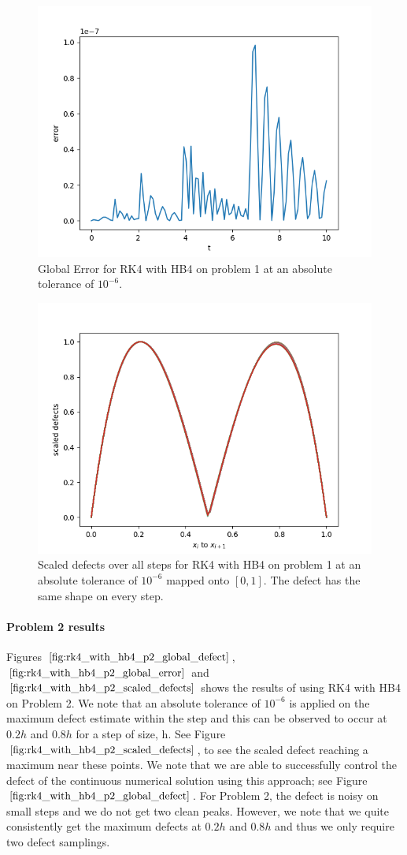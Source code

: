 \begin{figure}[H]
\centering
\includegraphics[width=0.7\linewidth]{./figures/rk4_with_hb4_p1_global_error}
\caption{Global Error for RK4 with HB4 on problem 1 at an absolute tolerance of $10^{-6}$.}
\label{fig:rk4_with_hb4_p1_global_error}
\end{figure}

\begin{figure}[H]
\centering
\includegraphics[width=0.7\linewidth]{./figures/rk4_with_hb4_p1_scaled_defects}
\caption{Scaled defects over all steps for RK4 with HB4 on problem 1 at an absolute tolerance of $10^{-6}$ mapped onto $[0, 1]$. The defect has the same shape on every step.}
\label{fig:rk4_with_hb4_p1_scaled_defects}
\end{figure}

\paragraph{Problem 2 results}
Figures $\ref{fig:rk4_with_hb4_p2_global_defect}$, $\ref{fig:rk4_with_hb4_p2_global_error}$ and $\ref{fig:rk4_with_hb4_p2_scaled_defects}$ shows the results of using RK4 with HB4 on Problem 2. We note that an absolute tolerance of $10^{-6}$ is applied on the maximum defect estimate within the step and this can be observed to occur at $0.2h$ and $0.8h$ for a step of size, h. See Figure $\ref{fig:rk4_with_hb4_p2_scaled_defects}$, to see the scaled defect reaching a maximum near these points. We note that we are able to successfully control the defect of the continuous numerical solution using this approach; see Figure $\ref{fig:rk4_with_hb4_p2_global_defect}$. For Problem 2, the defect is noisy on small steps and we do not get two clean peaks. However, we note that we quite consistently get the maximum defects at $0.2h$ and $0.8h$ and thus we only require two defect samplings.

